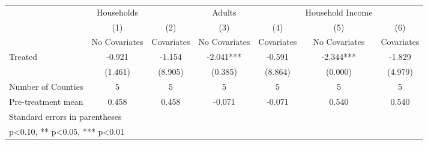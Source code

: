 {
\def\sym#1{\ifmmode^{#1}\else\(^{#1}\)\fi}
\begin{tabular}{l*{6}{c}}
\hline\hline
            &  Households   &               &      Adults   &               &Household Income   &               \\
            &\multicolumn{1}{c}{(1)}&\multicolumn{1}{c}{(2)}&\multicolumn{1}{c}{(3)}&\multicolumn{1}{c}{(4)}&\multicolumn{1}{c}{(5)}&\multicolumn{1}{c}{(6)}\\
            &\multicolumn{1}{c}{No Covariates}&\multicolumn{1}{c}{Covariates}&\multicolumn{1}{c}{No Covariates}&\multicolumn{1}{c}{Covariates}&\multicolumn{1}{c}{No Covariates}&\multicolumn{1}{c}{Covariates}\\
\hline
Treated     &      -0.921   &      -1.154   &      -2.041***&      -0.591   &      -2.344***&      -1.829   \\
            &     (1.461)   &     (8.905)   &     (0.385)   &     (8.864)   &     (0.000)   &     (4.979)   \\
\hline
Number of Counties&           5   &           5   &           5   &           5   &           5   &           5   \\
Pre-treatment mean&       0.458   &       0.458   &      -0.071   &      -0.071   &       0.540   &       0.540   \\
\hline\hline
\multicolumn{7}{l}{\footnotesize Standard errors in parentheses}\\
\multicolumn{7}{l}{\footnotesize * p<0.10, ** p<0.05, *** p<0.01}\\
\end{tabular}
}
